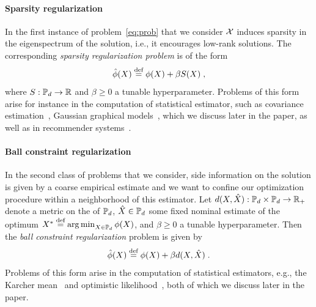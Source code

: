 \documentclass[sn-nature]{sn-jnl}%
\theoremstyle{thmstyleone}%
\theoremstyle{thmstyletwo}%
\theoremstyle{thmstylethree}%
\begin{document}
\paragraph{Sparsity regularization} In the first instance of problem~\ref{eq:prob} that we consider $\mathcal{X}$ induces sparsity in the eigenspectrum of the solution, i.e., it encourages low-rank solutions. The corresponding \emph{sparsity regularization problem} is of the form 
\begin{equation}\label{eq:sparsity_reg_problem}
    \hat{\phi}(X) \stackrel{\text{def}}{=} \phi(X) + \beta S(X)   \; ,
\end{equation}
where $S:\mathbb{P}_d \to \mathbb{R}$ and $\beta \geq 0$ a tunable hyperparameter. Problems of this form arise for instance in the computation of statistical estimator, such as covariance estimation~\citep{bien}, Gaussian graphical models~\citep{uhler2017gaussiangraphicalmodelsalgebraic}, which we discuss later in the paper, as well as in recommender systems~\citep{vandereycken2013low}.

\paragraph{Ball constraint regularization} In the second class of problems that we consider, side information on the solution is given by a coarse empirical estimate and we want to confine our optimization procedure within a neighborhood of this estimator.
Let $d(X, \hat{X}): \mathbb{P}_d \times \mathbb{P}_d \to \mathbb{R}_+$ denote a metric on the  of $\mathbb{P}_d$, $\hat{X} \in \mathbb{P}_d$ some fixed nominal estimate of the optimum $X^* \stackrel{\text{def}}{=} \operatorname*{arg\,min}_{X \in \mathbb{P}_d}\phi(X)$, and $\beta \geq 0$ a tunable hyperparameter. Then the \emph{ball constraint regularization} problem is given by
\begin{equation}\label{eq:ball_constrain_problem}
    \hat{\phi}(X) \stackrel{\text{def}}{=} \phi(X) + \beta d(X, \hat{X}) \; .    
\end{equation}
Problems of this form arise in the computation of statistical estimators, e.g., the Karcher mean~\citep{Karcher1977RiemannianCO} and optimistic likelihood~\citep{Nguyen2019CalculatingOL}, both of which we discuss later in the paper. 
\end{document}
